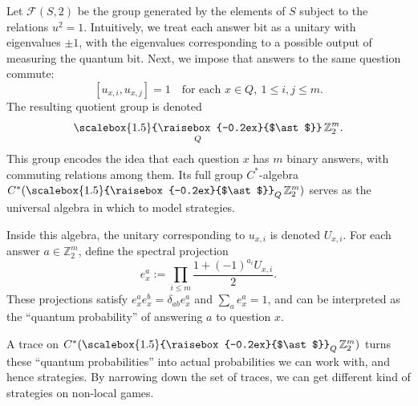\documentclass[pdflatex,sn-mathphys-num]{sn-jnl}%
\newcommand{\Conv}{\mathop{\scalebox{1.5}{\raisebox{-0.2ex}{$\ast$}}}}
\begin{document}
Let $\mathcal{F}(S,2)$ be the group generated by the elements of $S$ subject to the relations $u^2 = 1$.  
Intuitively, we treat each answer bit as a unitary with eigenvalues $\pm 1$, with the eigenvalues corresponding to a possible output of measuring the quantum bit.
Next, we impose that answers to the same question commute:
\[
    [u_{x,i},u_{x,j}] = 1 \quad \text{for each } x \in Q,\ 1 \leq i,j \leq m.
\]
The resulting quotient group is denoted
\[
    \Conv_Q \mathbb{Z}_2^m.
\]
This group encodes the idea that each question $x$ has $m$ binary answers, with commuting relations among them.  
Its full group $C^*$-algebra $C^*(\Conv_Q \mathbb{Z}_2^m)$ serves as the universal algebra in which to model strategies.

Inside this algebra, the unitary corresponding to $u_{x,i}$ is denoted $U_{x,i}$.  
For each answer $a \in \mathbb{Z}_2^m$, define the spectral projection
\[
    e_x^a := \prod_{i \leq m} \frac{1 + (-1)^{a_i} U_{x,i}}{2}.
\]
These projections satisfy $e_x^a e_x^b = \delta_{ab} e_x^a$ and $\sum_a e_x^a = 1$,  
and can be interpreted as the ``quantum probability'' of answering $a$ to question $x$.

A trace on $C^*(\Conv_Q \mathbb{Z}_2^m)$ turns these ``quantum probabilities'' into actual probabilities we can work with, and hence strategies. By narrowing down the set of traces, we can get different kind of strategies on non-local games.
\end{document}
